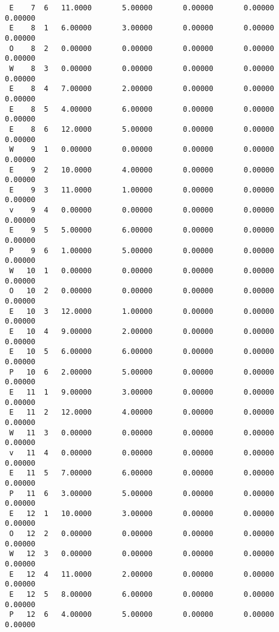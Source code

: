 \begin{verbatim}
 E    7  6   11.0000       5.00000       0.00000       0.00000       0.00000    
 E    8  1   6.00000       3.00000       0.00000       0.00000       0.00000    
 O    8  2   0.00000       0.00000       0.00000       0.00000       0.00000    
 W    8  3   0.00000       0.00000       0.00000       0.00000       0.00000    
 E    8  4   7.00000       2.00000       0.00000       0.00000       0.00000    
 E    8  5   4.00000       6.00000       0.00000       0.00000       0.00000    
 E    8  6   12.0000       5.00000       0.00000       0.00000       0.00000    
 W    9  1   0.00000       0.00000       0.00000       0.00000       0.00000    
 E    9  2   10.0000       4.00000       0.00000       0.00000       0.00000    
 E    9  3   11.0000       1.00000       0.00000       0.00000       0.00000    
 v    9  4   0.00000       0.00000       0.00000       0.00000       0.00000    
 E    9  5   5.00000       6.00000       0.00000       0.00000       0.00000    
 P    9  6   1.00000       5.00000       0.00000       0.00000       0.00000    
 W   10  1   0.00000       0.00000       0.00000       0.00000       0.00000    
 O   10  2   0.00000       0.00000       0.00000       0.00000       0.00000    
 E   10  3   12.0000       1.00000       0.00000       0.00000       0.00000    
 E   10  4   9.00000       2.00000       0.00000       0.00000       0.00000    
 E   10  5   6.00000       6.00000       0.00000       0.00000       0.00000    
 P   10  6   2.00000       5.00000       0.00000       0.00000       0.00000    
 E   11  1   9.00000       3.00000       0.00000       0.00000       0.00000    
 E   11  2   12.0000       4.00000       0.00000       0.00000       0.00000    
 W   11  3   0.00000       0.00000       0.00000       0.00000       0.00000    
 v   11  4   0.00000       0.00000       0.00000       0.00000       0.00000    
 E   11  5   7.00000       6.00000       0.00000       0.00000       0.00000    
 P   11  6   3.00000       5.00000       0.00000       0.00000       0.00000    
 E   12  1   10.0000       3.00000       0.00000       0.00000       0.00000    
 O   12  2   0.00000       0.00000       0.00000       0.00000       0.00000    
 W   12  3   0.00000       0.00000       0.00000       0.00000       0.00000    
 E   12  4   11.0000       2.00000       0.00000       0.00000       0.00000    
 E   12  5   8.00000       6.00000       0.00000       0.00000       0.00000    
 P   12  6   4.00000       5.00000       0.00000       0.00000       0.00000   
\end{verbatim}
\normalsize
 
